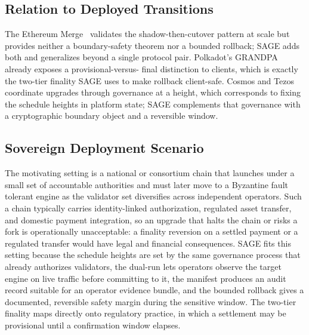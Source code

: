 \documentclass[journal]{IEEEtran}
\theoremstyle{definition}
\theoremstyle{remark}
\begin{document}
\subsection{Relation to Deployed Transitions}
The Ethereum Merge~\cite{gasper} validates the shadow-then-cutover pattern at scale but provides
neither a boundary-safety theorem nor a bounded rollback; SAGE adds both and generalizes beyond
a single protocol pair. Polkadot's GRANDPA~\cite{grandpa} already exposes a provisional-versus-
final distinction to clients, which is exactly the two-tier finality SAGE uses to make rollback
client-safe. Cosmos and Tezos~\cite{tenderbake} coordinate upgrades through governance at a
height, which corresponds to fixing the schedule heights in platform state; SAGE complements
that governance with a cryptographic boundary object and a reversible window.

\subsection{Sovereign Deployment Scenario}
\label{sec:deploy}
The motivating setting is a national or consortium chain that launches under a small set of
accountable authorities and must later move to a Byzantine fault tolerant engine as the
validator set diversifies across independent operators. Such a chain typically carries
identity-linked authorization, regulated asset transfer, and domestic payment integration, so an
upgrade that halts the chain or risks a fork is operationally unacceptable: a finality reversion
on a settled payment or a regulated transfer would have legal and financial consequences. SAGE
fits this setting because the schedule heights are set by the same governance process that
already authorizes validators, the dual-run lets operators observe the target engine on live
traffic before committing to it, the manifest produces an audit record suitable for an operator
evidence bundle, and the bounded rollback gives a documented, reversible safety margin during the
sensitive window. The two-tier finality maps directly onto regulatory practice, in which a
settlement may be provisional until a confirmation window elapses.
\end{document}
